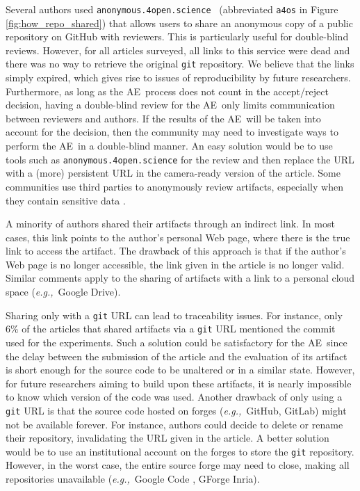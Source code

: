 \documentclass[sigconf,natbib=false]{acmart}
\newcommand{\eg}{\emph{e.g.,}}
\newcommand{\aeval}{AE}
\begin{document}
Several authors used \texttt{anonymous.4open.science}\ \cite{anonymous_github} (abbreviated \texttt{a4os} in Figure \ref{fig:how_repo_shared}) that allows users to share an anonymous copy of a public repository on GitHub with reviewers.
This is particularly useful for double-blind reviews.
However, for all articles surveyed, all links to this service were dead and there was no way to retrieve the original \texttt{git} repository.
We believe that the links simply expired, which gives rise to issues of reproducibility by future researchers.
Furthermore, as long as the \aeval\ process does not count in the accept/reject decision, having a double-blind review for the \aeval\ only limits communication between reviewers and authors.
If the results of the \aeval\ will be taken into account for the decision, then the community may need to investigate ways to perform the \aeval\ in a double-blind manner.
An easy solution would be to use tools such as \texttt{anonymous.4open.science} \cite{anonymous_github} for the review and then replace the URL with a (more) persistent URL in the camera-ready version of the article.
Some communities use third parties to anonymously review artifacts, especially when they contain sensitive data \cite{perignon2019certify}.

A minority of authors shared their artifacts through an indirect link.
In most cases, this link points to the author's personal Web page, where there is the true link to access the artifact.
The drawback of this approach is that if the author's Web page is no longer accessible, the link given in the article is no longer valid.
Similar comments apply to the sharing of artifacts with a link to a personal cloud space (\eg\ Google Drive).

Sharing only with a \texttt{git} URL can lead to traceability issues.
For instance, only 6\% of the articles that shared artifacts via a \texttt{git} URL mentioned the commit used for the experiments.
Such a solution could be satisfactory for the \aeval\ since the delay between the submission of the article and the evaluation of its artifact is short enough for the source code to be unaltered or in a similar state.
However, for future researchers aiming to build upon these artifacts, it is nearly impossible to know which version of the code was used.
Another drawback of only using a \texttt{git} URL is that the source code hosted on forges (\eg\ GitHub, GitLab) might not be available forever.
For instance, authors could decide to delete or rename their repository, invalidating the URL given in the article.
A better solution would be to use an institutional account on the forges to store the \texttt{git} repository.
However, in the worst case, the entire source forge may need to close, making all repositories unavailable (\eg\ Google Code \cite{google_code}, GForge Inria).
\end{document}
